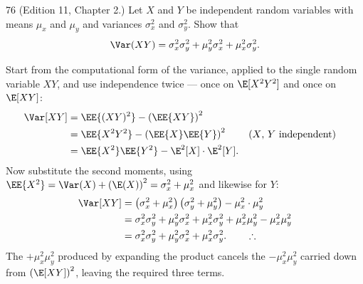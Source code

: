 \documentclass[11pt]{article}
\begin{document}
\begin{problem}{76}
  (Edition 11, Chapter 2.) Let $X$ and $Y$ be independent random variables
  with means $\mu_x$ and $\mu_y$ and variances $\sigma_x^2$ and
  $\sigma_y^2$. Show that
  \[
    \Var(XY) = \sigma_x^2 \sigma_y^2 + \mu_y^2 \sigma_x^2
             + \mu_x^2 \sigma_y^2 .
  \]
\end{problem}
Start from the computational form of the variance, applied to the single random variable
$XY$, and use independence twice --- once on $\E[X^{2}Y^{2}]$ and once on $\E[XY]$:
\begin{align*}
  \Var[XY] &= \EE{(XY)^{2}} - \left(\EE{XY}\right)^{2}\\
           &= \EE{X^{2}Y^{2}} - \left(\EE{X}\EE{Y}\right)^{2}
              &&\text{($X$, $Y$ independent)}\\
           &= \EE{X^{2}}\EE{Y^{2}} - \E^{2}[X]\cdot\E^{2}[Y].
\end{align*}
Now substitute the second moments, using
$\EE{X^{2}} = \Var(X) + \left(\E(X)\right)^{2} = \sigma_{x}^{2} + \mu_{x}^{2}$ and
likewise for $Y$:
\begin{align*}
  \Var[XY]
    &= \left(\sigma_{x}^{2} + \mu_{x}^{2}\right)
       \left(\sigma_{y}^{2} + \mu_{y}^{2}\right)
       - \mu_{x}^{2}\cdot\mu_{y}^{2}\\
    &= \sigma_{x}^{2}\sigma_{y}^{2} + \mu_{y}^{2}\sigma_{x}^{2}
       + \mu_{x}^{2}\sigma_{y}^{2} + \mu_{x}^{2}\mu_{y}^{2}
       - \mu_{x}^{2}\mu_{y}^{2}\\
    &= \sigma_{x}^{2}\sigma_{y}^{2} + \mu_{y}^{2}\sigma_{x}^{2}
       + \mu_{x}^{2}\sigma_{y}^{2}. \qquad\therefore
\end{align*}
The $+\mu_{x}^{2}\mu_{y}^{2}$ produced by expanding the product cancels the
$-\mu_{x}^{2}\mu_{y}^{2}$ carried down from $\left(\E[XY]\right)^{2}$, leaving the
required three terms.
\end{document}
